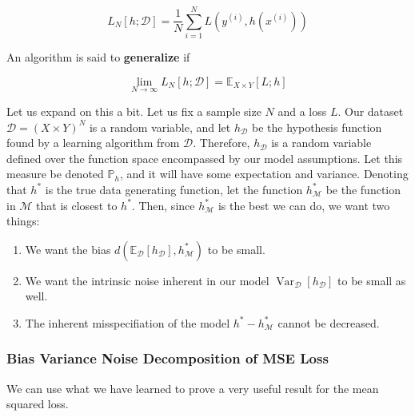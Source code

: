\documentclass{article}
\DeclareMathOperator{\Var}{Var}
\theoremstyle{definition}
\begin{document}
        \[L_N [h; \mathcal{D}] = \frac{1}{N} \sum_{i=1}^N L(y^{(i)}, h(x^{(i)}) )\]

      An algorithm is said to \textbf{generalize} if 

        \[\lim_{N \rightarrow \infty} L_N [h; \mathcal{D}] = \mathbb{E}_{X \times Y}[L; h]\]

      Let us expand on this a bit. Let us fix a sample size $N$ and a loss $L$. Our dataset $\mathcal{D} = (X \times Y)^N$ is a random variable, and let $h_\mathcal{D}$ be the hypothesis function found by a learning algorithm from $\mathcal{D}$. Therefore, $h_{\mathcal{D}}$ is a random variable defined over the function space encompassed by our model assumptions. Let this measure be denoted $\mathbb{P}_h$, and it will have some expectation and variance. Denoting that $h^\ast$ is the true data generating function, let the function $h^\ast_\mathcal{M}$ be the function in $\mathcal{M}$ that is closest to $h^\ast$. Then, since $h_\mathcal{M}^\ast$ is the best we can do, we want two things: 

      \begin{enumerate}
        \item We want the bias $d(\mathbb{E}_\mathcal{D} [ h_\mathcal{D}], h^\ast_\mathcal{M})$ to be small. 
        \item We want the intrinsic noise inherent in our model $\Var_\mathcal{D} [h_\mathcal{D}]$ to be small as well. 
        \item The inherent misspecifiation of the model $h^\ast - h^\ast_{\mathcal{M}}$ cannot be decreased. 
      \end{enumerate}

    \subsubsection{Bias Variance Noise Decomposition of MSE Loss}

      We can use what we have learned to prove a very useful result for the mean squared loss. 
\end{document}

